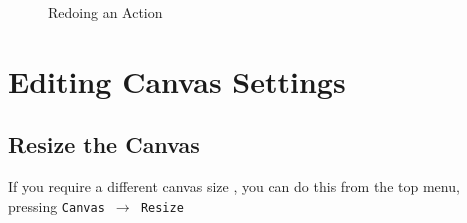 \documentclass[a4paper]{article}
\begin{document}
{\begin{figure}[H] \begin{center} 
\label{fig:redo}
\caption{Redoing an Action}
\vspace{-20pt}
\end{center} \end{figure} 

\section{Editing Canvas Settings}
\subsection{Resize the Canvas} 
If you require a different canvas size , you can do this from the top menu, pressing \texttt{Canvas $\rightarrow$ Resize}

}
\end{document}

